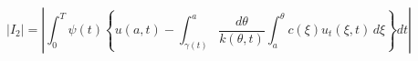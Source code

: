 \documentclass{article}
\begin{document}
\[    |I_2|=\left| \int_{0}^T \psi(t) 
             \left\{ 
                u(a,t)-
                \int_{\gamma(t)}^a 
                \frac{d\theta}{k(\theta,t)}
                \int_{a}^\theta c(\xi)u_t(\xi,t)\,d\xi
             \right\} dt
          \right|
\]
\pagebreak
\end{document}
